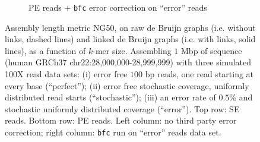 \documentclass[a4paper]{article}
\newcommand*\kmer{$k$-mer\xspace}
\begin{document}
\begin{figure}[H]
\begin{subfigure}{.45\textwidth}
\caption{PE reads + \texttt{bfc} error correction on ``error'' reads}
\end{subfigure}
\caption{Assembly length metric NG50, on raw de Bruijn graphs (i.e. without links, dashed lines) and linked de Bruijn graphs (i.e. with links, solid lines), as a function of \kmer{} size. Assembling $1$ Mbp of sequence (human GRCh37 chr22:28,000,000-28,999,999) with three simulated 100X read data sets: (i) error free $100$ bp reads, one read starting at every base (``perfect''); (ii) error free stochastic coverage, uniformly distributed read starts (``stochastic''); (iii) an error rate of $0.5\%$ and stochastic uniformly distributed coverage (``error''). Top row: SE reads. Bottom row: PE reads. Left column: no third party error correction; right column: \texttt{bfc} run on ``error'' reads data set.}
\label{fig:ng50sim}
\end{figure}
\end{document}
